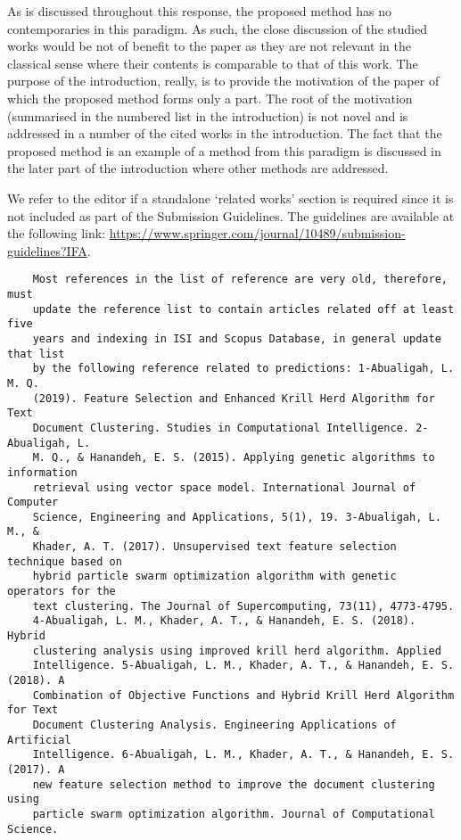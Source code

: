 \documentclass[11pt]{article}
\begin{document}
As is discussed throughout this response, the proposed method has no
contemporaries in this paradigm. As such, the close discussion of the studied
works would be not of benefit to the paper as they are not relevant in the
classical sense where their contents is comparable to that of this work. The
purpose of the introduction, really, is to provide the motivation of the paper
of which the proposed method forms only a part. The root of the motivation
(summarised in the numbered list in the introduction) is not novel and is
addressed in a number of the cited works in the introduction. The fact that the
proposed method is an example of a method from this paradigm is discussed in the
later part of the introduction where other methods are addressed.

We refer to the editor if a standalone `related works' section is required since
it is not included as part of the Submission Guidelines. The guidelines are
available at the following link:
\url{https://www.springer.com/journal/10489/submission-guidelines?IFA}.\\

\begin{tcolorbox}
\begin{verbatim}
    Most references in the list of reference are very old, therefore, must
    update the reference list to contain articles related off at least five
    years and indexing in ISI and Scopus Database, in general update that list
    by the following reference related to predictions: 1-Abualigah, L. M. Q.
    (2019). Feature Selection and Enhanced Krill Herd Algorithm for Text
    Document Clustering. Studies in Computational Intelligence. 2-Abualigah, L.
    M. Q., & Hanandeh, E. S. (2015). Applying genetic algorithms to information
    retrieval using vector space model. International Journal of Computer
    Science, Engineering and Applications, 5(1), 19. 3-Abualigah, L. M., &
    Khader, A. T. (2017). Unsupervised text feature selection technique based on
    hybrid particle swarm optimization algorithm with genetic operators for the
    text clustering. The Journal of Supercomputing, 73(11), 4773-4795.
    4-Abualigah, L. M., Khader, A. T., & Hanandeh, E. S. (2018). Hybrid
    clustering analysis using improved krill herd algorithm. Applied
    Intelligence. 5-Abualigah, L. M., Khader, A. T., & Hanandeh, E. S. (2018). A
    Combination of Objective Functions and Hybrid Krill Herd Algorithm for Text
    Document Clustering Analysis. Engineering Applications of Artificial
    Intelligence. 6-Abualigah, L. M., Khader, A. T., & Hanandeh, E. S. (2017). A
    new feature selection method to improve the document clustering using
    particle swarm optimization algorithm. Journal of Computational Science.
\end{verbatim}
\end{tcolorbox}
\end{document}
